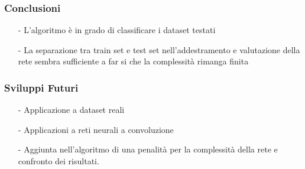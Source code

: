 \documentclass{beamer}
\begin{document}
\begin{frame}
 \frametitle{Conclusioni}
 \begin{enumerate}
  \item [-] L'algoritmo è in grado di classificare i dataset testati
  \item [-] La separazione tra train set e test set nell'addestramento e valutazione della rete sembra sufficiente a far si che la complessità rimanga finita
 \end{enumerate}

\end{frame}

\begin{frame}
 \large
 \frametitle{Sviluppi Futuri}
 \begin{enumerate}
  \item [-] Applicazione a dataset reali
  \item [-] Applicazioni a reti neurali a convoluzione
  \item [-] Aggiunta nell'algoritmo di una penalità per la complessità della rete e confronto dei risultati.
 \end{enumerate}

\end{frame}
\end{document}
